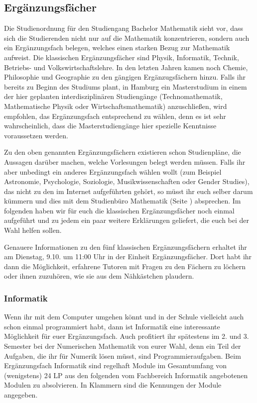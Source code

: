 
\subsection{Ergänzungsfächer} \label{page:erg}

Die Studienordnung für den Studiengang Bachelor Mathematik sieht vor, dass sich
die Studierenden nicht nur auf die Mathematik konzentrieren, sondern auch ein
Ergänzungsfach belegen, welches einen starken Bezug zur Mathematik aufweist.
Die klassischen Ergänzungsfächer sind Physik, Informatik, Technik, Betriebs-
und Volkswirtschaftslehre. In den letzten Jahren kamen noch Chemie, Philosophie
und Geographie zu den gängigen Ergänzugsfächern hinzu. Falls ihr bereits zu
Beginn des Studiums plant, in Hamburg ein Masterstudium in einem der hier
geplanten interdisziplinären Studiengänge (Technomathematik, Mathematische
Physik oder Wirtschaftsmathematik) anzuschließen, wird empfohlen, das
Ergänzungsfach entsprechend zu wählen, denn es ist sehr wahrscheinlich, dass
die Masterstudiengänge hier spezielle Kenntnisse voraussetzen werden.

Zu den oben genannten Ergänzungsfächern existieren schon Studienpläne, die
Aussagen darüber machen, welche Vorlesungen belegt werden müssen. Falls ihr
aber unbedingt ein anderes Ergänzungsfach wählen wollt (zum Beispiel
Astronomie, Psychologie, Soziologie, Musikwissenschaften oder Gender Studies),
das nicht zu den im Internet aufgeführten gehört, so müsst ihr euch selber
darum kümmern und dies mit dem Studienbüro Mathematik (Seite
\pageref{studienburo}) absprechen. Im folgenden haben wir für euch die
klassischen Ergänzungsfächer noch einmal aufgeführt und zu jedem ein paar
weitere Erklärungen geliefert, die euch bei der Wahl helfen sollen.

Genauere Informationen zu den fünf klassischen Ergänzungsfächern erhaltet ihr
am Dienstag, 9.10. um 11:00 Uhr in der Einheit Ergänzungsfächer. Dort habt ihr
dann die Möglichkeit, erfahrene Tutoren mit Fragen zu den Fächern zu löchern
oder ihnen zuzuhören, wie sie aus dem Nähkästchen plaudern.

\subsubsection{Informatik}

Wenn ihr mit dem Computer umgehen könnt und in der Schule vielleicht auch schon
einmal programmiert habt, dann ist Informatik eine interessante Möglichkeit für
euer Ergänzungsfach. Auch profitiert ihr spätestens im 2. und 3.  Semester bei
der Numerischen Mathematik von eurer Wahl, denn ein Teil der Aufgaben, die ihr
für Numerik lösen müsst, sind Programmieraufgaben. Beim Ergänzungsfach
Informatik sind regelhaft Module im Gesamtumfang von (wenigstens) 24 LP aus den
folgenden vom Fachbereich Informatik angebotenen Modulen zu absolvieren. In
Klammern sind die Kennungen der Module angegeben.


